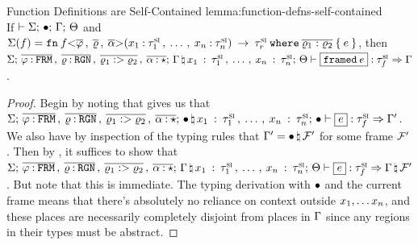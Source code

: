 \begin{oxlemma}{Function Definitions are Self-Contained}
  {lemma:function-defns-self-contained}\hfill\\
  If $\vdash \Sigma; \, \bullet; \, \Gamma; \, \Theta$ and
  $\Sigma(f) = 
    \mathtt{fn} \: f \mathtt{<} 
      \overline{\varphi} \, , \: \overline{\varrho} \, , \: \overline{\alpha}
     \mathtt{>}(
      x_1 \: {:} \: \tau^\textsc{si}_1 \, , \: \ldots \, , \:
      x_n \: {:} \: \tau^\textsc{si}_n
    ) \: \rightarrow \: \tau^\textsc{si}_r \: \mathtt{where} \: \overline{\varrho_1: \varrho_2} \: \{ \:  e  \: \}
 $, then
  $\oxtypjudge{\oxglobalctx}{
    \overline{\oxtvarctxentry{\oxenvvar}{\oxkenv}} \oxcomma
    \overline{\oxtvarctxentry{\oxabsprov}{\oxkprov}} \oxcomma
    \overline{\oxabsprov_1 \oxoutlives \oxabsprov_2} \oxcomma
    \overline{\oxtvarctxentry{\oxtvar}{\oxktype}}
  }{\oxkontctx}{
    \oxnewframe{\oxvarctx}{
      \oxvarctxentry{\oxid_1}{\oxsitype_1} \oxdotsc
      \oxvarctxentry{\oxid_n}{\oxsitype_n}
    }
  }{
    \oxframed{\oxexpr}
  }{\oxsitype_f}{\oxvarctx}$.
\end{oxlemma}

\begin{proof}
  Begin by noting that  gives us that
  \\ $\oxtypjudge{\oxglobalctx}{\overline{\oxtvarctxentry{\oxenvvar}{\oxkenv}}
    \oxcomma \overline{\oxtvarctxentry{\oxabsprov}{\oxkprov}} \oxcomma
    \overline{\oxabsprov_1 \oxoutlives \oxabsprov_2} \oxcomma
    \overline{\oxtvarctxentry{\oxtvar}{\oxktype}}}{\oxemptyctx}{\oxnewframe{\oxemptyctx}
    {\oxvarctxentry{\oxid_1}{\oxsitype_1} \oxdotsc
      \oxvarctxentry{\oxid_n}{\oxsitype_n}}}{\oxexpr}{\oxsitype_f}{\oxvarctx^\prime}$.
  We also have by inspection of the typing rules that $\Gamma^\prime =
  \bullet \, \natural \, \mathcal{F}^\prime$ for some frame $\mathcal{F}^\prime$.
  Then by , it suffices to show that
  $\oxtypjudge{\oxglobalctx}{\overline{\oxtvarctxentry{\oxenvvar}{\oxkenv}}
    \oxcomma \overline{\oxtvarctxentry{\oxabsprov}{\oxkprov}} \oxcomma
    \overline{\oxabsprov_1 \oxoutlives \oxabsprov_2} \oxcomma
    \overline{\oxtvarctxentry{\oxtvar}{\oxktype}}}{\oxkontctx}{\oxnewframe{\oxvarctx}
    {\oxvarctxentry{\oxid_1}{\oxsitype_1} \oxdotsc
      \oxvarctxentry{\oxid_n}{\oxsitype_n}}}{\oxexpr}{\oxsitype_f}{\oxnewframe{\oxvarctx}{\oxframe^\prime}}$.
  But note that this is immediate. The typing derivation with $\bullet$ and
  the current frame means that there's absolutely no reliance on context outside
  $x_1, \ldots x_n$, and these places are necessarily completely
  disjoint from places in $\Gamma$ since any regions in their types must
  be abstract.
\end{proof}

